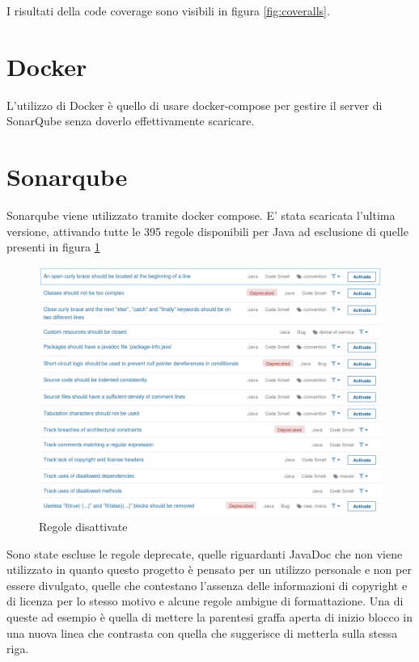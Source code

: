 		I risultati della code coverage sono visibili in figura \ref{fig:coveralls}.
		
	\section{Docker}
		L'utilizzo di Docker è quello di usare docker-compose per gestire il server di SonarQube senza doverlo effettivamente scaricare. 
		
	\section{Sonarqube}
		Sonarqube viene utilizzato tramite docker compose. E' stata scaricata l'ultima versione, attivando tutte le 395 regole disponibili per Java ad esclusione di quelle presenti in figura \ref{fig:sonarules}
		
		\begin{figure}[h]
			\centering
			\includegraphics[scale=0.4]{img/sonarqube_rules}
			\caption{Regole disattivate}
			\label{fig:sonarules}
		\end{figure}
		
		Sono state escluse le regole deprecate, quelle riguardanti JavaDoc che non viene utilizzato in quanto questo progetto è pensato per un utilizzo personale e non per essere divulgato, quelle che contestano l'assenza delle informazioni di copyright e di licenza per lo stesso motivo e alcune regole ambigue di formattazione. Una di queste ad esempio è quella di mettere la parentesi graffa aperta di inizio blocco in una nuova linea che contrasta con quella che suggerisce di metterla sulla stessa riga.
		
